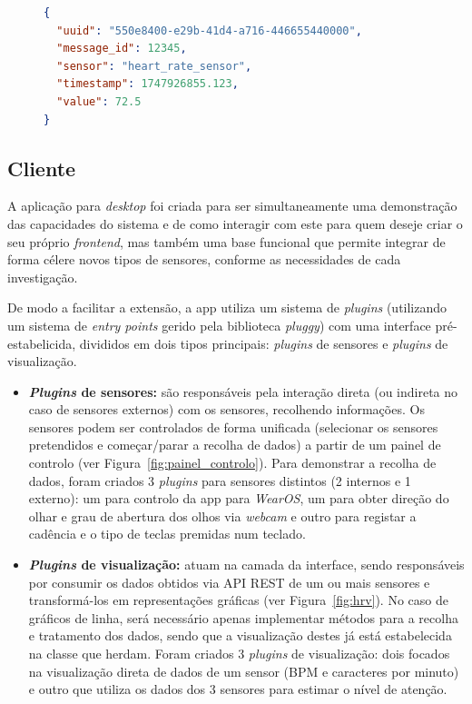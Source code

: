 \begin{figure}[h!]
\centering
\begin{minipage}{\textwidth}
\begin{lstlisting}[language=json, caption={Exemplo da estrutura de uma mensagem ingerida}, label={code:example_message}]
{
  "uuid": "550e8400-e29b-41d4-a716-446655440000",
  "message_id": 12345,
  "sensor": "heart_rate_sensor",
  "timestamp": 1747926855.123,
  "value": 72.5
}
\end{lstlisting}
\end{minipage}
\end{figure}

\subsection{Cliente}

A aplicação para \textit{desktop} foi criada para ser simultaneamente uma demonstração das capacidades do sistema e de como interagir com este para quem deseje criar o seu próprio \textit{frontend}, mas também uma base funcional que permite integrar de forma célere novos tipos de sensores, conforme as necessidades de cada investigação.

De modo a facilitar a extensão, a app utiliza um sistema de \textit{plugins} (utilizando um sistema de \textit{entry points} gerido pela biblioteca \textit{pluggy}) com uma interface pré-estabelicida, divididos em dois tipos principais: \textit{plugins} de sensores e \textit{plugins} de visualização.
\begin{itemize}
    \item \textbf{\textit{Plugins} de sensores:} são responsáveis pela interação direta (ou indireta no caso de sensores externos) com os sensores, recolhendo informações. Os sensores podem ser controlados de forma unificada (selecionar os sensores pretendidos e começar/parar a recolha de dados) a partir de um painel de controlo (ver Figura~\ref{fig:painel_controlo}). Para demonstrar a recolha de dados, foram criados 3 \textit{plugins} para sensores distintos (2 internos e 1 externo): um para controlo da app para \textit{WearOS}, um para obter direção do olhar e grau de abertura dos olhos via \textit{webcam} e outro para registar a cadência e o tipo de teclas premidas num teclado.
    \item \textbf{\textit{Plugins} de visualização:} atuam na camada da interface, sendo responsáveis por consumir os dados obtidos via API REST de um ou mais sensores e transformá-los em representações gráficas (ver Figura~\ref{fig:hrv}). No caso de gráficos de linha, será necessário apenas implementar métodos para a recolha e tratamento dos dados, sendo que a visualização destes já está estabelecida na classe que herdam. Foram criados 3 \textit{plugins} de visualização: dois focados na visualização direta de dados de um sensor (\ac{BPM} e caracteres por minuto) e outro que utiliza os dados dos 3 sensores para estimar o nível de atenção.
\end{itemize}

